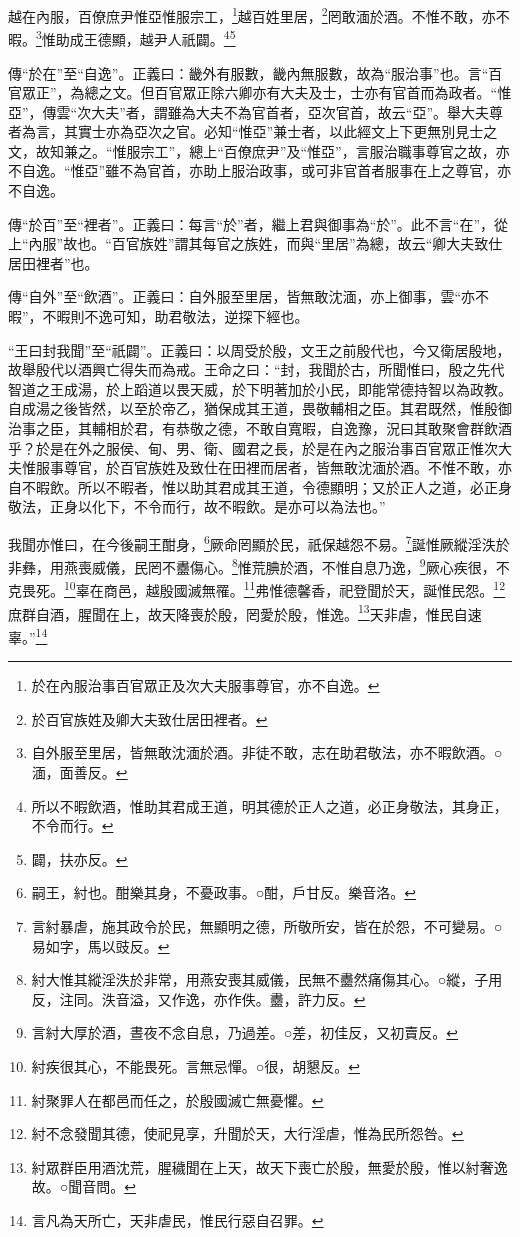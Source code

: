 越在內服，百僚庶尹惟亞惟服宗工，\footnote{於在內服治事百官眾正及次大夫服事尊官，亦不自逸。}越百姓里居，\footnote{於百官族姓及卿大夫致仕居田裡者。}罔敢湎於酒。不惟不敢，亦不暇。\footnote{自外服至里居，皆無敢沈湎於酒。非徒不敢，志在助君敬法，亦不暇飲酒。○湎，面善反。}惟助成王德顯，越尹人祇闢。\footnote{所以不暇飲酒，惟助其君成王道，明其德於正人之道，必正身敬法，其身正，不令而行。}\footnote{闢，扶亦反。}

{\noindent\zhuan{}\fzbyks 傳“於在”至“自逸”。正義曰：畿外有服數，畿內無服數，故為“服治事”也。言“百官眾正”，為總之文。但百官眾正除六卿亦有大夫及士，士亦有官首而為政者。“惟亞”，傳雲“次大夫”者，謂雖為大夫不為官首者，亞次官首，故云“亞”。舉大夫尊者為言，其實士亦為亞次之官。必知“惟亞”兼士者，以此經文上下更無別見士之文，故知兼之。“惟服宗工”，總上“百僚庶尹”及“惟亞”，言服治職事尊官之故，亦不自逸。“惟亞”雖不為官首，亦助上服治政事，或可非官首者服事在上之尊官，亦不自逸。 \par}

{\noindent\zhuan{}\fzbyks 傳“於百”至“裡者”。正義曰：每言“於”者，繼上君與御事為“於”。此不言“在”，從上“內服”故也。“百官族姓”謂其每官之族姓，而與“里居”為總，故云“卿大夫致仕居田裡者”也。 \par}

{\noindent\zhuan{}\fzbyks 傳“自外”至“飲酒”。正義曰：自外服至里居，皆無敢沈湎，亦上御事，雲“亦不暇”，不暇則不逸可知，助君敬法，逆探下經也。 \par}

{\noindent\shu{}\fzkt “王曰封我聞”至“祇闢”。正義曰：以周受於殷，文王之前殷代也，今又衛居殷地，故舉殷代以酒興亡得失而為戒。王命之曰：“封，我聞於古，所聞惟曰，殷之先代智道之王成湯，於上蹈道以畏天威，於下明著加於小民，即能常德持智以為政教。自成湯之後皆然，以至於帝乙，猶保成其王道，畏敬輔相之臣。其君既然，惟殷御治事之臣，其輔相於君，有恭敬之德，不敢自寬暇，自逸豫，況曰其敢聚會群飲酒乎？於是在外之服侯、甸、男、衛、國君之長，於是在內之服治事百官眾正惟次大夫惟服事尊官，於百官族姓及致仕在田裡而居者，皆無敢沈湎於酒。不惟不敢，亦自不暇飲。所以不暇者，惟以助其君成其王道，令德顯明；又於正人之道，必正身敬法，正身以化下，不令而行，故不暇飲。是亦可以為法也。” \par}

我聞亦惟曰，在今後嗣王酣身，\footnote{嗣王，紂也。酣樂其身，不憂政事。○酣，戶甘反。樂音洛。}厥命罔顯於民，祇保越怨不易。\footnote{言紂暴虐，施其政令於民，無顯明之德，所敬所安，皆在於怨，不可變易。○易如字，馬以豉反。}誕惟厥縱淫泆於非彝，用燕喪威儀，民罔不衋傷心。\footnote{紂大惟其縱淫泆於非常，用燕安喪其威儀，民無不衋然痛傷其心。○縱，子用反，注同。泆音溢，又作逸，亦作佚。衋，許力反。}惟荒腆於酒，不惟自息乃逸，\footnote{言紂大厚於酒，晝夜不念自息，乃過差。○差，初佳反，又初賣反。}厥心疾很，不克畏死。\footnote{紂疾很其心，不能畏死。言無忌憚。○很，胡懇反。}辜在商邑，越殷國滅無罹。\footnote{紂聚罪人在都邑而任之，於殷國滅亡無憂懼。}弗惟德馨香，祀登聞於天，誕惟民怨。\footnote{紂不念發聞其德，使祀見享，升聞於天，大行淫虐，惟為民所怨咎。}庶群自酒，腥聞在上，故天降喪於殷，罔愛於殷，惟逸。\footnote{紂眾群臣用酒沈荒，腥穢聞在上天，故天下喪亡於殷，無愛於殷，惟以紂奢逸故。○聞音問。}天非虐，惟民自速辜。”\footnote{言凡為天所亡，天非虐民，惟民行惡自召罪。}


